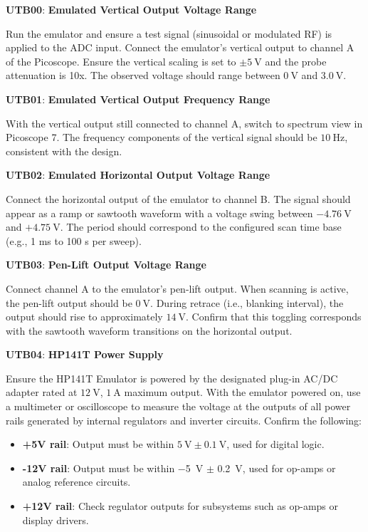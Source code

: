 \documentclass[class=report,11pt,crop=false]{standalone}
\begin{document}
	\begin{center}
		\textbf{UTB00}: \textbf{Emulated Vertical Output Voltage Range}
	\end{center}
	Run the emulator and ensure a test signal (sinusoidal or modulated RF) is applied to the ADC input. Connect the emulator’s vertical output to channel A of the Picoscope. Ensure the vertical scaling is set to $\pm\SI{5}{\volt}$ and the probe attenuation is 10x. The observed voltage should range between $\SI{0}{\volt}$ and $\SI{3.0}{\volt}$.
	
	\begin{center}
		\textbf{UTB01}: \textbf{Emulated Vertical Output Frequency Range}
	\end{center}
	With the vertical output still connected to channel A, switch to spectrum view in Picoscope 7. The frequency components of the vertical signal should be $\SI{10}{\hertz}$, consistent with the design.
	
	\begin{center}
		\textbf{UTB02}: \textbf{Emulated Horizontal Output Voltage Range}
	\end{center}
	Connect the horizontal output of the emulator to channel B. The signal should appear as a ramp or sawtooth waveform with a voltage swing between $-\SI{4.76}{\volt}$ and $+\SI{4.75}{\volt}$. The period should correspond to the configured scan time base (e.g., 1 ms to 100 s per sweep).
	
	\begin{center}
		\textbf{UTB03}: \textbf{Pen-Lift Output Voltage Range}
	\end{center}
	Connect channel A to the emulator’s pen-lift output. When scanning is active, the pen-lift output should be $\SI{0}{\volt}$. During retrace (i.e., blanking interval), the output should rise to approximately $\SI{14}{\volt}$. Confirm that this toggling corresponds with the sawtooth waveform transitions on the horizontal output.
	
	\begin{center}
		\textbf{UTB04}: \textbf{HP141T Power Supply}
	\end{center}
	Ensure the HP141T Emulator is powered by the designated plug-in AC/DC adapter rated at $\SI{12}{\volt}$, $\SI{1}{\ampere}$ maximum output. With the emulator powered on, use a multimeter or oscilloscope to measure the voltage at the outputs of all power rails generated by internal regulators and inverter circuits. Confirm the following:
	
	\begin{itemize}
		\item \textbf{+5V rail}: Output must be within $\SI{5}{\volt} \pm \SI{0.1}{\volt}$, used for digital logic.
		\item \textbf{-12V rail}: Output must be within \SI{-5}{\volt} $\pm$ \SI{0.2}{\volt}, used for op-amps or analog reference circuits.
		\item \textbf{+12V rail}: Check regulator outputs for subsystems such as op-amps or display drivers.
	\end{itemize}
	
\end{document}
